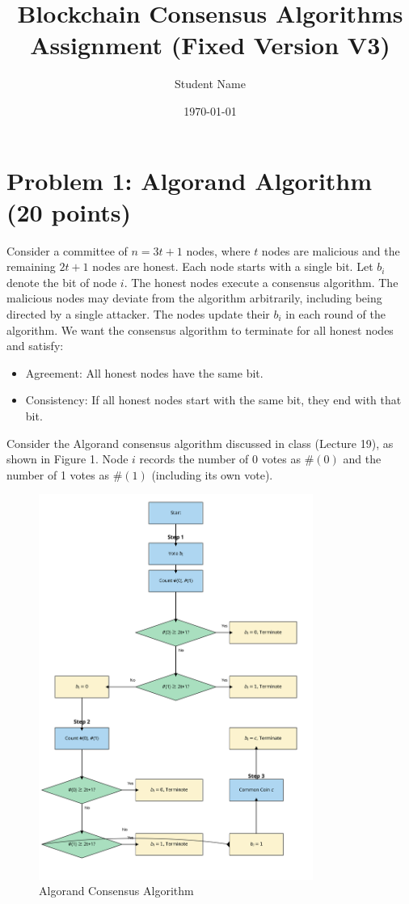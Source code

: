 \documentclass[12pt,a4paper]{article}
\title{Blockchain Consensus Algorithms Assignment (Fixed Version V3)}
\author{Student Name}
\date{\today}
\begin{document}
\maketitle

\section{Problem 1: Algorand Algorithm (20 points)}

Consider a committee of $n = 3t + 1$ nodes, where $t$ nodes are malicious and the remaining $2t + 1$ nodes are honest. Each node starts with a single bit. Let $b_i$ denote the bit of node $i$. The honest nodes execute a consensus algorithm. The malicious nodes may deviate from the algorithm arbitrarily, including being directed by a single attacker. The nodes update their $b_i$ in each round of the algorithm. We want the consensus algorithm to terminate for all honest nodes and satisfy:

\begin{itemize}
    \item Agreement: All honest nodes have the same bit.
    \item Consistency: If all honest nodes start with the same bit, they end with that bit.
\end{itemize}

Consider the Algorand consensus algorithm discussed in class (Lecture 19), as shown in Figure 1. Node $i$ records the number of 0 votes as $\#(0)$ and the number of 1 votes as $\#(1)$ (including its own vote).

\begin{figure}[H] %
    \centering
    \includegraphics[width=0.8\textwidth]{images/algorand_algorithm_improved.png}
    \caption{Algorand Consensus Algorithm}
\end{figure}
\end{document}
